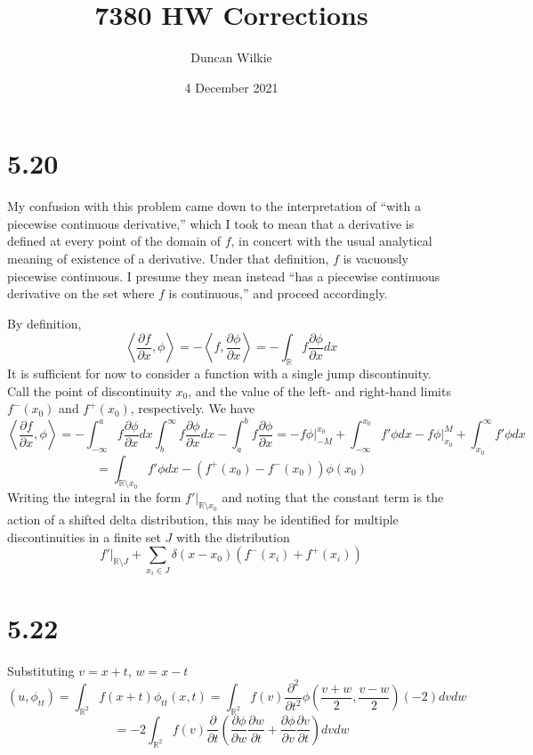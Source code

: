 \documentclass{article}
\title{7380 HW Corrections}
\author{Duncan Wilkie}
\date{4 December 2021}
\begin{document}
\maketitle

\section*{5.20}
My confusion with this problem came down to the interpretation of ``with a piecewise continuous derivative,'' which I took to mean that a derivative is defined at every point of the domain of $f$, in concert with the usual analytical meaning of existence of a derivative. Under that definition, $f$ is vacuously piecewise continuous. I presume they mean instead ``has a piecewise continuous derivative on the set where $f$ is continuous,'' and proceed accordingly.

By definition,
\[\left\langle\frac{\partial f}{\partial x}, \phi\right\rangle=-\left\langle f, \frac{\partial \phi}{\partial x} \right\rangle=-\int_\mathbb{R} f\frac{\partial \phi}{\partial x}dx\]
It is sufficient for now to consider a function with a single jump discontinuity. Call the point of discontinuity $x_0$, and the value of the left- and right-hand limits $f^-(x_0)$ and $f^+(x_0)$, respectively. We have
\[\left\langle\frac{\partial f}{\partial x},\phi\right\rangle=-\int_{-\infty}^{a}f\frac{\partial\phi}{\partial x}dx\int_{b}^\infty f\frac{\partial\phi}{\partial x}dx - \int_a^bf\frac{\partial \phi}{\partial x}=-f\phi\bigg|_{-M}^{x_0}+\int_{-\infty}^{x_0}f'\phi dx-f\phi\bigg|_{x_0}^{M}+\int_{x_0}^\infty f'\phi dx\]\[=\int_{\mathbb{R}\setminus x_0}f'\phi dx-(f^+(x_0)-f^-(x_0))\phi(x_0)\]
Writing the integral in the form $f'\bigg|_{\mathbb{R}\setminus x_0}$ and noting that the constant term is the action of a shifted delta distribution, this may be identified for multiple discontinuities in a finite set $J$ with the distribution
\[f'\bigg|_{\mathbb{R}\setminus J}+\sum_{x_i\in J}\delta(x-x_0)(f^-(x_i)+f^+(x_i))\]

\section*{5.22}
Substituting $v=x+t$, $w=x-t$
\[(u, \phi_{tt})=\int_{\mathbb{R}^2}f(x+t)\phi_{tt}(x,t)=\int_{\mathbb{R}^2}f(v)\frac{\partial^2}{\partial t^2} \phi\left(\frac{v+w}{2},\frac{v-w}{2}\right)(-2)dvdw\]
\[=-2\int_{\mathbb{R}^2}f(v)\frac{\partial}{\partial t}\left( \frac{\partial \phi}{\partial w}\frac{\partial w}{\partial t}+\frac{\partial \phi}{\partial v}\frac{\partial v}{\partial t} \right)dvdw\]
\end{document}
